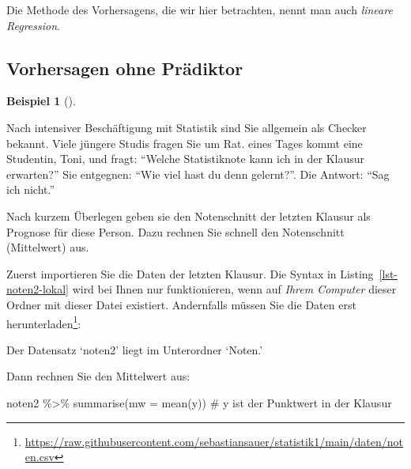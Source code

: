 \documentclass[
  letterpaper,
]{scrbook}
\newenvironment{Shaded}{\begin{snugshade}}{\end{snugshade}}
\newcommand{\AttributeTok}[1]{\textcolor[rgb]{0.40,0.45,0.13}{#1}}
\newcommand{\CommentTok}[1]{\textcolor[rgb]{0.37,0.37,0.37}{#1}}
\newcommand{\FunctionTok}[1]{\textcolor[rgb]{0.28,0.35,0.67}{#1}}
\newcommand{\NormalTok}[1]{\textcolor[rgb]{0.00,0.23,0.31}{#1}}
\newcommand{\OtherTok}[1]{\textcolor[rgb]{0.00,0.23,0.31}{#1}}
\newcommand{\SpecialCharTok}[1]{\textcolor[rgb]{0.37,0.37,0.37}{#1}}
\newcommand{\StringTok}[1]{\textcolor[rgb]{0.13,0.47,0.30}{#1}}
\theoremstyle{definition}
\newtheorem{example}{Beispiel}[chapter]
\theoremstyle{definition}
\theoremstyle{definition}
\theoremstyle{remark}
\begin{document}
Die Methode des Vorhersagens, die wir hier betrachten, nennt man auch
\emph{lineare Regression}.

\subsection{Vorhersagen ohne
Prädiktor}\label{vorhersagen-ohne-pruxe4diktor}

\begin{example}[]\protect\hypertarget{exm-noten-prognose}{}\label{exm-noten-prognose}

Nach intensiver Beschäftigung mit Statistik sind Sie allgemein als
Checker bekannt. Viele jüngere Studis fragen Sie um Rat. eines Tages
kommt eine Studentin, Toni, und fragt: ``Welche Statistiknote kann ich
in der Klausur erwarten?'' Sie entgegnen: ``Wie viel hast du denn
gelernt?''. Die Antwort: ``Sag ich nicht.''

Nach kurzem Überlegen geben sie den Notenschnitt der letzten Klausur als
Prognose für diese Person. Dazu rechnen Sie schnell den Notenschnitt
(Mittelwert) aus.

Zuerst importieren Sie die Daten der letzten Klausur. Die Syntax in
Listing~\ref{lst-noten2-lokal} wird bei Ihnen nur funktionieren, wenn
auf \emph{Ihrem Computer} dieser Ordner mit dieser Datei existiert.
Andernfalls müssen Sie die Daten erst herunterladen\footnote{\url{https://raw.githubusercontent.com/sebastiansauer/statistik1/main/daten/noten.csv}}:

\begin{codelisting}

\caption{\label{lst-noten2-lokal}Der Datensatz `noten2' liegt im
Unterordner `Noten.'}

\centering{

\begin{Shaded}
\begin{Highlighting}[]
\NormalTok{noten2 }\OtherTok{\textless{}{-}} \FunctionTok{read.csv}\NormalTok{(}\StringTok{"daten/noten2.csv"}\NormalTok{)}
\end{Highlighting}
\end{Shaded}

}

\end{codelisting}%

Dann rechnen Sie den Mittelwert aus:

\begin{Shaded}
\begin{Highlighting}[]
\NormalTok{noten2 }\SpecialCharTok{\%\textgreater{}\%} 
  \FunctionTok{summarise}\NormalTok{(}\AttributeTok{mw =} \FunctionTok{mean}\NormalTok{(y))  }\CommentTok{\# y ist der Punktwert in der Klausur}
\end{Highlighting}
\end{Shaded}


\end{example}
\end{document}
